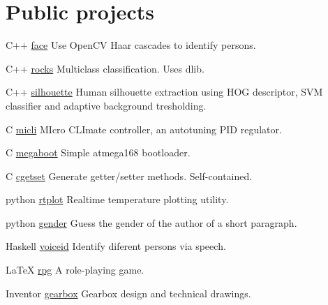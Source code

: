 \documentclass{tccv}
\begin{document}
\section{Public projects}
\begin{yearlist}
\item{C++}
     {\href{https://github.com/MiroslavVitkov/face}{face}}
     {Use OpenCV Haar cascades to identify persons. }

\item{C++}
     {\href{https://github.com/MiroslavVitkov/rocks}{rocks}}
     {Multiclass classification. Uses dlib.}

\item{C++}
     {\href{https://github.com/MiroslavVitkov/silhouette}{silhouette}}
     {Human silhouette extraction using HOG descriptor, SVM classifier and adaptive background tresholding.}

\item{C}
     {\href{https://github.com/MiroslavVitkov/micli}{micli}}
     {MIcro CLImate controller, an autotuning PID regulator.}

\item{C}
     {\href{https://github.com/MiroslavVitkov/megaboot}{megaboot}}
     {Simple atmega168 bootloader.}

\item{C}
     {\href{https://github.com/MiroslavVitkov/cgetset}{cgetset}}
     {Generate getter/setter methods. Self-contained.}

\item{python}
     {\href{https://github.com/MiroslavVitkov/rtplot}{rtplot}}
     {Realtime temperature plotting utility.}


\item{python}
     {\href{https://github.com/MiroslavVitkov/gender}{gender}}
     {Guess the gender of the author of a short paragraph.}


\item{Haskell}
     {\href{https://github.com/MiroslavVitkov/voiceid}{voiceid}}
     {Identify diferent persons via speech.}

\item{LaTeX}
     {\href{https://github.com/MiroslavVitkov/rpg}{rpg}}
     {A role-playing game.}

\item{Inventor}
     {\href{https://github.com/MiroslavVitkov/gearbox}{gearbox}}
     {Gearbox design and technical drawings.}
\end{yearlist}
\end{document}
